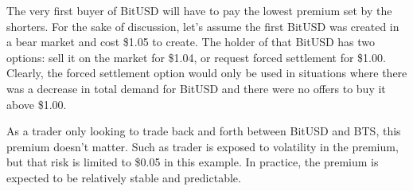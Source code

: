 The very first buyer of BitUSD will have to pay the lowest premium set by the
shorters. For the sake of discussion, let's assume the first BitUSD was created
in a bear market and cost \$1.05 to create. The holder of that BitUSD has two
options: sell it on the market for \$1.04, or request forced settlement for
\$1.00. Clearly, the forced settlement option would only be used in situations
where there was a decrease in total demand for BitUSD and there were no offers
to buy it above \$1.00.

As a trader only looking to trade back and forth between BitUSD and BTS, this
premium doesn't matter. Such as trader is exposed to volatility in the premium,
but that risk is limited to \$0.05 in this example. In practice, the premium is
expected to be relatively stable and predictable.
